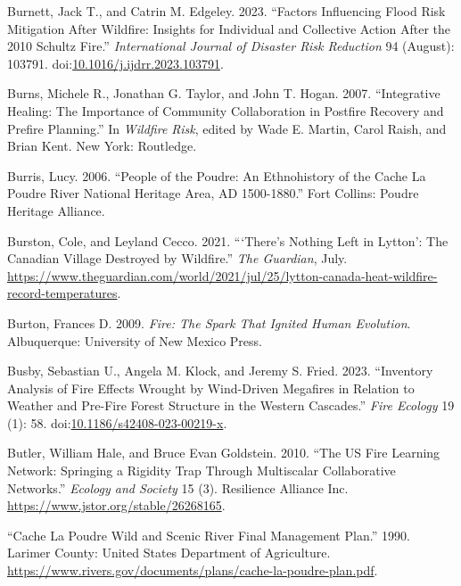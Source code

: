 \documentclass[
]{article}
\newlength{\cslhangindent}
\newenvironment{CSLReferences}[2] %
 {\begin{list}{}{%
  \setlength{\itemindent}{0pt}
  \setlength{\leftmargin}{0pt}
  \setlength{\parsep}{0pt}
  \ifodd #1
   \setlength{\leftmargin}{\cslhangindent}
   \setlength{\itemindent}{-1\cslhangindent}
  \fi
  \setlength{\itemsep}{#2\baselineskip}}}
 {\end{list}}
\begin{document}
\begin{CSLReferences}{1}{0}
Burnett, Jack T., and Catrin M. Edgeley. 2023. {``Factors Influencing Flood Risk Mitigation After Wildfire: {Insights} for Individual and Collective Action After the 2010 {Schultz Fire}.''} \emph{International Journal of Disaster Risk Reduction} 94 (August): 103791. doi:\href{https://doi.org/10.1016/j.ijdrr.2023.103791}{10.1016/j.ijdrr.2023.103791}.

Burns, Michele R., Jonathan G. Taylor, and John T. Hogan. 2007. {``Integrative {Healing}: {The Importance} of {Community Collaboration} in {Postfire Recovery} and {Prefire Planning}.''} In \emph{Wildfire {Risk}}, edited by Wade E. Martin, Carol Raish, and Brian Kent. New York: Routledge.

Burris, Lucy. 2006. {``People of the {Poudre}: {An Ethnohistory} of the {Cache} La {Poudre River National Heritage Area}, {AD} 1500-1880.''} Fort Collins: Poudre Heritage Alliance.

Burston, Cole, and Leyland Cecco. 2021. {``{`{There}'s Nothing Left in {Lytton}'}: The {Canadian} Village Destroyed by Wildfire.''} \emph{The Guardian}, July. \url{https://www.theguardian.com/world/2021/jul/25/lytton-canada-heat-wildfire-record-temperatures}.

Burton, Frances D. 2009. \emph{Fire: The Spark That Ignited Human Evolution}. Albuquerque: University of New Mexico Press.

Busby, Sebastian U., Angela M. Klock, and Jeremy S. Fried. 2023. {``Inventory Analysis of Fire Effects Wrought by Wind-Driven Megafires in Relation to Weather and Pre-Fire Forest Structure in the Western {Cascades}.''} \emph{Fire Ecology} 19 (1): 58. doi:\href{https://doi.org/10.1186/s42408-023-00219-x}{10.1186/s42408-023-00219-x}.

Butler, William Hale, and Bruce Evan Goldstein. 2010. {``The {US Fire Learning Network}: {Springing} a {Rigidity Trap} Through {Multiscalar Collaborative Networks}.''} \emph{Ecology and Society} 15 (3). Resilience Alliance Inc. \url{https://www.jstor.org/stable/26268165}.

{``Cache {La Poudre Wild} and {Scenic River Final Management Plan}.''} 1990. Larimer County: United States Department of Agriculture. \url{https://www.rivers.gov/documents/plans/cache-la-poudre-plan.pdf}.


\end{CSLReferences}
\end{document}
